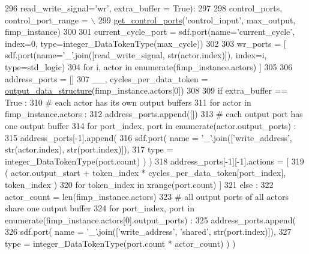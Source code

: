 \begin{DoxyCode}
296   read\_write\_signal=\textcolor{stringliteral}{'wr'}, extra\_buffer = \textcolor{keyword}{True}):
297 
298   control\_ports, control\_port\_range = \(\backslash\)
299   \hyperlink{namespacesylva_1_1code__generation_1_1air_a71d379169f113b29c326aa9f70c6d47e}{get\_control\_ports}(\textcolor{stringliteral}{'control\_input'}, max\_output, fimp\_instance)
300 
301   current\_cycle\_port = sdf.port(name=\textcolor{stringliteral}{'current\_cycle'}, index=0, type=integer\_DataTokenType(max\_cycle))
302 
303   wr\_ports = [ sdf.port(name=\textcolor{stringliteral}{'\_'}.join([read\_write\_signal, str(actor.index)]), index=i, type=std\_logic)
304                \textcolor{keywordflow}{for} i, actor \textcolor{keywordflow}{in} enumerate(fimp\_instance.actors) ]
305 
306   address\_ports = []
307   \_\_, cycles\_per\_data\_token = \hyperlink{namespacesylva_1_1code__generation_1_1air_a83186b3b999778cee36ac81d42b2cd44}{output\_data\_structure}(fimp\_instance.actors[0])
308 
309   \textcolor{keywordflow}{if} extra\_buffer == \textcolor{keyword}{True} :
310     \textcolor{comment}{# each actor has its own output buffers}
311     \textcolor{keywordflow}{for} actor \textcolor{keywordflow}{in} fimp\_instance.actors :
312       address\_ports.append([])
313       \textcolor{comment}{# each output port has one output buffer}
314       \textcolor{keywordflow}{for} port\_index, port \textcolor{keywordflow}{in} enumerate(actor.output\_ports) :
315         address\_ports[-1].append(
316           sdf.port( name = \textcolor{stringliteral}{'\_'}.join([\textcolor{stringliteral}{'write\_address'}, str(actor.index), str(port.index)]),
317             type = integer\_DataTokenType(port.count) ) )
318         address\_ports[-1][-1].actions = [
319           ( actor.output\_start + token\_index * cycles\_per\_data\_token[port\_index], token\_index )
320             \textcolor{keywordflow}{for} token\_index \textcolor{keywordflow}{in} xrange(port.count) ]
321   \textcolor{keywordflow}{else} :
322     actor\_count = len(fimp\_instance.actors)
323     \textcolor{comment}{# all output ports of all actors share one output buffer}
324     \textcolor{keywordflow}{for} port\_index, port \textcolor{keywordflow}{in} enumerate(fimp\_instance.actors[0].output\_ports) :
325       address\_ports.append(
326         sdf.port( name = \textcolor{stringliteral}{'\_'}.join([\textcolor{stringliteral}{'write\_address'}, \textcolor{stringliteral}{'shared'}, str(port.index)]),
327           type = integer\_DataTokenType(port.count * actor\_count) ) )

\end{DoxyCode}
